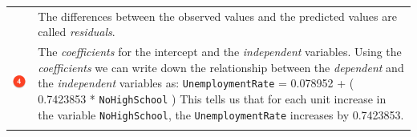 \documentclass[]{article}
\begin{document}
\begin{longtable}[]{@{}ll@{}}
\begin{minipage}[t]{0.07\columnwidth}
\end{minipage} & \begin{minipage}[t]{0.87\columnwidth}\raggedright
The differences between the observed values and the predicted values are called \emph{residuals}.\strut
\end{minipage}\tabularnewline
\begin{minipage}[t]{0.07\columnwidth}\raggedright
\includegraphics[width=1\textwidth,height=\textheight]{./img/circle4.png}\strut
\end{minipage} & \begin{minipage}[t]{0.87\columnwidth}\raggedright
The \emph{coefficients} for the intercept and the \emph{independent} variables. Using the \emph{coefficients} we can write down the relationship between the \emph{dependent} and the \emph{independent} variables as: \texttt{UnemploymentRate} = 0.078952 + ( 0.7423853 * \texttt{NoHighSchool} ) This tells us that for each unit increase in the variable \texttt{NoHighSchool}, the \texttt{UnemploymentRate} increases by 0.7423853.\strut
\end{minipage}\tabularnewline
\begin{minipage}[t]{0.07\columnwidth}\raggedright

\end{minipage}
\end{longtable}
\end{document}
